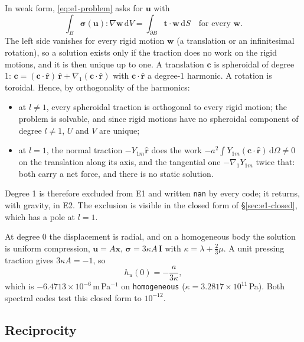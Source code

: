 \documentclass[11pt]{article}
\numberwithin{equation}{section}
\newcommand{\dS}{\,\mathrm{d}S}
\newcommand{\dV}{\,\mathrm{d}V}
\newcommand{\vu}{\mathbf{u}}
\newcommand{\vw}{\mathbf{w}}
\newcommand{\vx}{\mathbf{x}}
\newcommand{\vt}{\mathbf{t}}
\newcommand{\rhat}{\hat{\mathbf{r}}}
\newcommand{\code}[1]{\texttt{#1}}
\newcommand{\gradone}{\nabla_{1}}
\newcommand{\bsig}{\bm{\sigma}}
\begin{document}
In weak form, \eqref{eq:e1-problem} asks for $\vu$ with
\begin{equation}
  \int_B \bsig(\vu):\nabla\vw\dV = \int_{\partial B}\vt\cdot\vw\dS
  \quad\text{for every } \vw .
\end{equation}
The left side vanishes for every rigid motion $\vw$ (a translation or an
infinitesimal rotation), so a solution exists only if the traction does no
work on the rigid motions, and it is then unique up to one. A translation
$\mathbf{c}$ is spheroidal of degree 1:
$\mathbf{c} = (\mathbf{c}\cdot\rhat)\,\rhat + \gradone(\mathbf{c}\cdot\rhat)$
with $\mathbf{c}\cdot\rhat$ a degree-1 harmonic. A rotation is toroidal.
Hence, by orthogonality of the harmonics:
\begin{itemize}[leftmargin=*]
\item at $l\ne1$, every spheroidal traction is orthogonal to every rigid
  motion; the problem is solvable, and since rigid motions have no
  spheroidal component of degree $l\ne1$, $U$ and $V$ are unique;
\item at $l=1$, the normal traction $-Y_{1m}\rhat$ does the work
  $-a^2\int Y_{1m}(\mathbf{c}\cdot\rhat)\,\mathrm{d}\Omega\ne0$ on the
  translation along its axis, and the tangential one $-\gradone Y_{1m}$
  twice that: both carry a net force, and there is no static solution.
\end{itemize}
Degree 1 is therefore excluded from E1 and written \code{nan} by every code;
it returns, with gravity, in E2. The exclusion is visible in the closed
form of \S\ref{sec:e1-closed}, which has a pole at $l=1$.

At degree 0 the displacement is radial, and on a homogeneous body the
solution is uniform compression, $\vu = A\vx$, $\bsig = 3\kappa A\,\mathbf
I$ with $\kappa=\lambda+\tfrac23\mu$. A unit pressing traction gives
$3\kappa A=-1$, so
\begin{equation}
  h_u(0) = -\frac{a}{3\kappa},
  \label{eq:degree0}
\end{equation}
which is $-6.4713\times10^{-6}$\,m\,Pa$^{-1}$ on \code{homogeneous}
($\kappa = 3.2817\times10^{11}$\,Pa). Both spectral codes test this closed
form to $10^{-12}$.

\subsection{Reciprocity}
\label{sec:e1-reciprocity}
\end{document}

